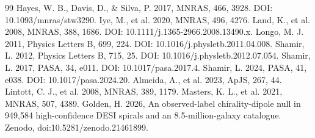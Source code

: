 \documentclass[11pt]{article}
\begin{document}
\begin{thebibliography}{99}
 Hayes, W. B., Davis, D., \& Silva, P. 2017, MNRAS, 466, 3928. DOI: 10.1093/mnras/stw3290.
 Iye, M., et al. 2020, MNRAS, 496, 4276.
 Land, K., et al. 2008, MNRAS, 388, 1686. DOI: 10.1111/j.1365-2966.2008.13490.x.
 Longo, M. J. 2011, Physics Letters B, 699, 224. DOI: 10.1016/j.physletb.2011.04.008.
 Shamir, L. 2012, Physics Letters B, 715, 25. DOI: 10.1016/j.physletb.2012.07.054.
 Shamir, L. 2017, PASA, 34, e011. DOI: 10.1017/pasa.2017.4.
 Shamir, L. 2024, PASA, 41, e038. DOI: 10.1017/pasa.2024.20.
 Almeida, A., et al. 2023, ApJS, 267, 44.
 Lintott, C. J., et al. 2008, MNRAS, 389, 1179.
 Masters, K. L., et al. 2021, MNRAS, 507, 4389.
 Golden, H. 2026, An observed-label chirality-dipole null in 949,584 high-confidence DESI spirals and an 8.5-million-galaxy catalogue. Zenodo, doi:10.5281/zenodo.21461899.
\end{thebibliography}
\end{document}
